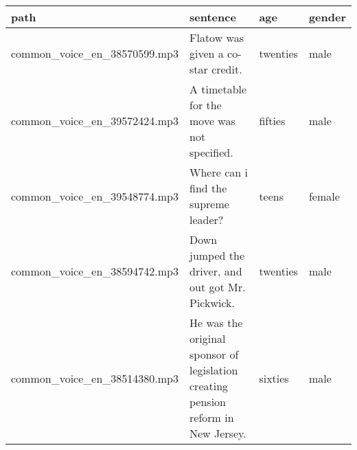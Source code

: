 \begin{tabular}{llll}
\toprule
path & sentence & age & gender \\
\midrule
common\_voice\_en\_38570599.mp3 & Flatow was given a co-star credit. & twenties & male \\
common\_voice\_en\_39572424.mp3 & A timetable for the move was not specified. & fifties & male \\
common\_voice\_en\_39548774.mp3 & Where can i find the supreme leader? & teens & female \\
common\_voice\_en\_38594742.mp3 & Down jumped the driver, and out got Mr. Pickwick. & twenties & male \\
common\_voice\_en\_38514380.mp3 & He was the original sponsor of legislation creating pension reform in New Jersey. & sixties & male \\
\bottomrule
\end{tabular}

